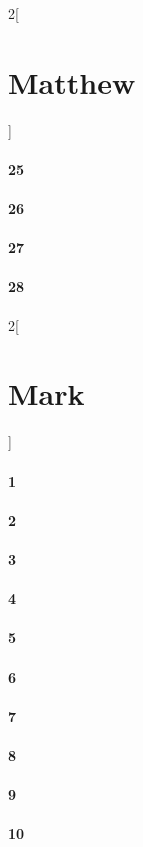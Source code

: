 \documentclass{book}
\begin{document}
\begin{multicols}{2}[\part{Matthew}]
\subsection*{25}
\subsection*{26}
\subsection*{27}
\subsection*{28}
\end{multicols}
\begin{multicols}{2}[\part{Mark}]
\subsection*{1}
\subsection*{2}
\subsection*{3}
\subsection*{4}
\subsection*{5}
\subsection*{6}
\subsection*{7}
\subsection*{8}
\subsection*{9}
\subsection*{10}

\end{multicols}
\end{document}
